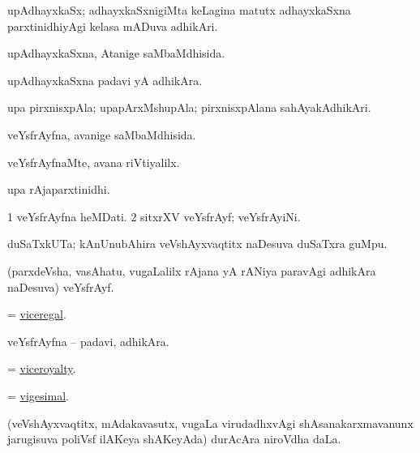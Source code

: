 \bentry
{} 
\gl{\nA}
\expl{}
\bmng
 upAdhayxkaSx; adhayxkaSxnigiMta keLagina matutx adhayxkaSxna parxtinidhiyAgi kelasa mADuva adhikAri. 
\emng
\eentry

\bentry
{} 
\gl{\gu}
\expl{}
\bmng
 upAdhayxkaSxna, Atanige saMbaMdhisida. 
\emng
\eentry

\bentry
{} 
\gl{\nA}
\expl{}
\bmng
 upAdhayxkaSxna padavi yA adhikAra. 
\emng
\eentry

\bentry
{} 
\gl{\nA}
\expl{}
\bmng
 upa pirxnisxpAla; upapArxMshupAla; pirxnisxpAlana sahAyakAdhikAri. 
\emng
\eentry

\bentry
{} 
\gl{\gu}
\expl{}
\bmng
 veYsfrAyfna, avanige saMbaMdhisida. 
\emng
\eentry

\bentry
{} 
\gl{\kirxvi}
\expl{}
\bmng
 veYsfrAyfnaMte, avana riVtiyalilx. 
\emng
\eentry

\bentry
{} 
\gl{\nA}
\expl{}
\bmng
 upa rAjaparxtinidhi. 
\emng
\eentry

\bentry
{} 
\gl{\nA}
\expl{}
\bmng
\bnum
\num{1} veYsfrAyfna heMDati. 
\num{2} sitxrXV veYsfrAyf; veYsfrAyiNi. 
\enum
\emng
\eentry

\bentry
{}
\gl{\nA}
\expl{}
\bmng
 duSaTxkUTa; kAnUnubAhira veVshAyxvaqtitx naDesuva duSaTxra guMpu. 
\emng
\eentry

\bentry
{} 
\gl{\nA}
\expl{}
\bmng
 (parxdeVsha, vasAhatu, \mo vugaLalilx rAjana yA rANiya paravAgi adhikAra naDesuva) veYsfrAyf. 
\emng
\eentry

\bentry
{} 
\gl{\gu}
\expl{}
\bmng
 = \hyperlink{viceregal}{viceregal}. 
\emng
\eentry

\bentry
{} 
\gl{\nA}
\expl{}
\bmng
 veYsfrAyfna -- padavi, adhikAra. 
\emng
\eentry

\bentry
{} 
\gl{\nA}
\expl{}
\bmng
 = \hyperlink{viceroyalty}{viceroyalty}. 
\emng
\eentry

\bentry
{} 
\gl{\gu}
\expl{}
\bmng
 = \hyperlink{vigesimal}{vigesimal}. 
\emng
\eentry

\bentry
{}
\gl{\nA}
\expl{}
\bmng
 (veVshAyxvaqtitx, mAdakavasutx, \mo vugaLa virudadhxvAgi shAsanakarxmavanunx jarugisuva poliVsf ilAKeya shAKeyAda) durAcAra niroVdha daLa. 
\emng
\eentry

